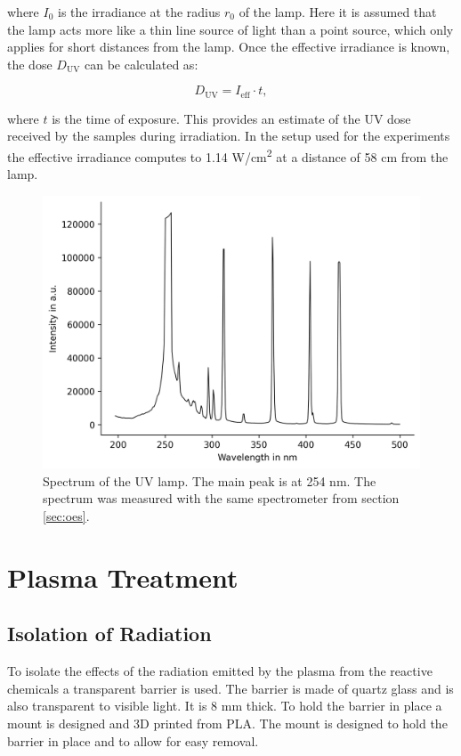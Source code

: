 where $I_0$ is the irradiance at the radius $r_0$ of the lamp. Here it is assumed that the lamp acts more like a thin line source of light than a point source, which only applies for short distances from the lamp. Once the effective irradiance is known, the dose $D_\text{UV}$ can be calculated as:

\begin{equation}
D_\text{UV} = I_\text{eff} \cdot t,
\label{eq:uv_dose}
\end{equation}

where $t$ is the time of exposure. This provides an estimate of the UV dose received by the samples during irradiation. In the setup used for the experiments the effective irradiance computes to 1.14 \textmu W/cm\textsuperscript{2} at a distance of 58 cm from the lamp.


\begin{figure}
    \centering
    \includegraphics[width=.8\textwidth]{images/UV_lamp_no_glass.png}
    \caption[Spectrum of UV lamp]{Spectrum of the UV lamp. The main peak is at 254 nm. The spectrum was measured with the same spectrometer from section \ref{sec:oes}.}
    \label{fig:uv}
\end{figure}

\section{Plasma Treatment}

\subsection{Isolation of Radiation}
To isolate the effects of the radiation emitted by the plasma from the reactive chemicals a transparent barrier is used. The barrier is made of quartz glass and is also transparent to visible light. It is 8 mm thick. To hold the barrier in place a mount is designed and 3D printed from PLA. The mount is designed to hold the barrier in place and to allow for easy removal.

